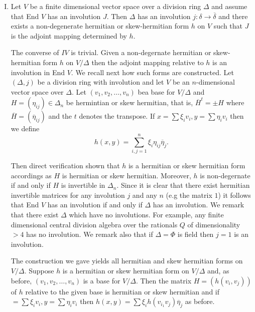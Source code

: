 \begin{enumerate}[I.]
\item Let $V$ be a finite dimensional vector space over a division ring $\Delta$ and assume that End $V$ has an involution $J$. Then $\Delta$ has an involution $j:\delta\to \overline{\delta}$ and there exists a non-degenerate hermitian or skew-hermitian form $h$ on $V$ such that $J$ is the adjoint mapping determined by $h$. 

The converse of $IV$ is trivial. Given a non-degernate hermitian or skew-hermitian form $h$ on $V/\Delta$ then the adjoint mapping relative to $h$ is an involution in End $V$. We recall next how such forms are  constructed. Let $(\Delta,j)$ be a division ring with involution and let $V$ be an $n$-dimensional vector space over $\Delta$. Let $(v_1,v_2,\ldots,v_n)$ be\pageoriginale a base for $V/\Delta$ and $H=(\eta_{ij})\in \Delta_n$ be hermintian or skew hermitian, that is, $\overline{H}^{t}=\pm H$ where $\overline{H}=(\overline{\eta}_{ij})$ and the $t$ denotes the transpose. If $x=\sum \xi_i v_i,y=\sum\eta_i v_i$ then we define
\begin{equation*}
h(x,y)=\sum\limits_{i,j=1}^{n}\xi_i\eta_{ij}\overline{\eta}_j.\tag{9}\label{c0:eq9}  
\end{equation*}

Then direct verification shown that $h$ is a hermitian or skew
hermitian form accordings as $H$ is hermitian or skew
hermitian. More\-over, $h$ is non-degernate if and only if $H$ is
invertible in $\Delta_n$. Since it is clear that there exist hermitian
invertible matrices for any involution $j$ and any $n$ (e.g the matrix
$1$) it follows that End $V$ has an involution if and only if $\Delta$
has an involution. We remark that there exist $\Delta$ which have no
involutions. For example, any finite dimensional central division
algebra over the rationals $Q$ of dimensionality $> 4$ has no
involution. We remark also that if $\Delta=\Phi$ is field then $j=1$
is an involution. 

The construction we gave yields all hermitian and skew hermitian forms on $V/\Delta$. Suppose $h$ is a hermitian or skew hermitian form on $V/\Delta$ and, as before, $(v_1,v_2,\ldots,v_n)$ is a base for $V/\Delta$. Then the matrix $H=(h(v_i,v_j))$ of $h$ relative to the given base is hermitian or skew hermitian and if $=\sum\xi_iv_i,y=\sum\eta_i v_i$ then $h(x,y)=\sum\xi_ih(v_{i_{1}}v_j)\overline{\eta}_j$ as before.


\end{enumerate}
